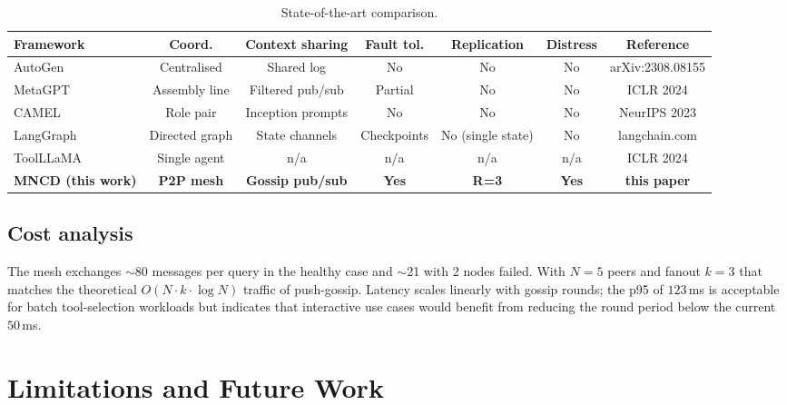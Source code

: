 \documentclass[conference]{IEEEtran}
\begin{document}
\begin{table}[t]
\caption{State-of-the-art comparison.}
\label{tab:sota}
\centering
\footnotesize
\begin{tabular}{lcccccc}
\toprule
\textbf{Framework} & \textbf{Coord.} & \textbf{Context sharing}
   & \textbf{Fault tol.} & \textbf{Replication} & \textbf{Distress}
   & \textbf{Reference} \\
\midrule
AutoGen \cite{wu2023autogen}        & Centralised   & Shared log         & No        & No  & No  & arXiv:2308.08155 \\
MetaGPT \cite{hong2024metagpt}      & Assembly line & Filtered pub/sub   & Partial   & No  & No  & ICLR 2024 \\
CAMEL \cite{li2023camel}            & Role pair     & Inception prompts  & No        & No  & No  & NeurIPS 2023 \\
LangGraph                           & Directed graph & State channels    & Checkpoints & No (single state) & No & langchain.com \\
ToolLLaMA \cite{qin2023toolllm}     & Single agent  & n/a                & n/a       & n/a & n/a & ICLR 2024 \\
\textbf{MNCD (this work)} & \textbf{P2P mesh} & \textbf{Gossip pub/sub} & \textbf{Yes} & \textbf{R=3} & \textbf{Yes} & \textbf{this paper} \\
\bottomrule
\end{tabular}
\end{table}

\subsection{Cost analysis}
The mesh exchanges $\sim$80 messages per query in the healthy case and
$\sim$21 with 2 nodes failed. With $N=5$ peers and fanout $k=3$ that matches
the theoretical $O(N \cdot k \cdot \log N)$ traffic of push-gossip. Latency
scales linearly with gossip rounds; the p95 of $123$\,ms is acceptable for
batch tool-selection workloads but indicates that interactive use cases would
benefit from reducing the round period below the current $50$\,ms.

\section{Limitations and Future Work}
\end{document}
